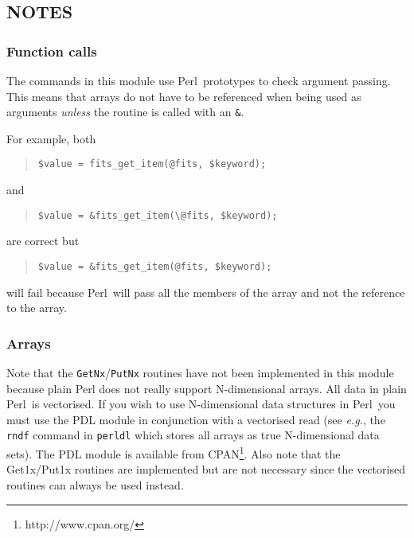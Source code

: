 \documentclass[twoside,11pt]{article}
\newenvironment{myquote}{\begin{quote}\begin{small}}{\end{small}\end{quote}}
\newcommand{\perl}{\xref{\textsf{Perl}}{sun193}{}}
\newcommand{\htmladdnormallinkfoot}[2]{#1\footnote{#2}}
\newcommand{\htmladdnormallink}[2]{#1}
\newcommand{\xref}[3]{#1}
\newcommand{\xlabel}[1]{}
\renewcommand{\_}{\texttt{\symbol{95}}}
\begin{document}
\subsection{\xlabel{notes}\label{notes}NOTES}

\subsubsection{Function calls}%

The commands in this module use  \perl\ prototypes to check argument 
passing. This means that arrays do not have to be referenced when being
used as arguments \emph{unless\/} the routine is called with an \texttt{\&}.

For example, both

\begin{myquote}
\begin{verbatim}
$value = fits_get_item(@fits, $keyword);
\end{verbatim}
\end{myquote}
and
\begin{myquote}
\begin{verbatim}
$value = &fits_get_item(\@fits, $keyword);
\end{verbatim}
\end{myquote}

are correct but
\begin{myquote} 
\begin{verbatim}
$value = &fits_get_item(@fits, $keyword);
\end{verbatim}
\end{myquote}

will fail because \perl\ will pass all the members of the array and not the
reference to the array. 

\subsubsection{Arrays}%

Note that the \texttt{GetNx}/\texttt{PutNx} routines have not been
implemented in this module because plain Perl does not really support
N-dimensional arrays.  All data in plain \perl\ is vectorised.  If you
wish to use N-dimensional data structures in \perl\ you must use the
\htmladdnormallink{PDL}{http://pdl.perl.org}
module in conjunction with a vectorised read (see \emph{e.g.}, the
\texttt{rndf} command in \texttt{perldl} which stores all arrays as
true N-dimensional data sets). The PDL module is available from
\htmladdnormallinkfoot{CPAN}{http://www.cpan.org/}. Also
note that the Get1x/Put1x routines are implemented but are not
necessary since the vectorised routines can always be used instead.
\end{document}
